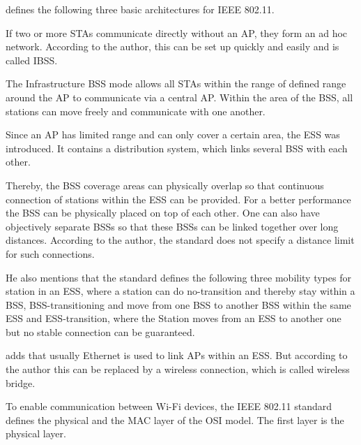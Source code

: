 \documentclass[]{nsm-thesis}
\begin{document}
\textcite[42,43,178-180]{kauffels_wireless_2002} defines the following three basic architectures for IEEE 802.11.

If two or more \acp{STA} communicate directly without an \ac{AP}, they form an ad hoc network.
According to the author, this can be set up quickly and easily and is called \ac{IBSS}.

The Infrastructure \ac{BSS} mode allows all \ac{STA}s within the range of defined range around the \ac{AP} to communicate via a central \ac{AP}. Within the area of the \ac{BSS}, all stations can move freely and communicate with one another.

Since an \ac{AP} has limited range and can only cover a certain area, the \ac{ESS} was introduced.
It contains a distribution system, which links several \ac{BSS} with each other.

Thereby, the BSS coverage areas can physically overlap so that continuous connection of stations within the ESS can be provided.
For a better performance the \ac{BSS} can be physically placed on top of each other.
One can also have objectively separate \ac{BSS}s so that these \ac{BSS}s can be linked together over long distances.
According to the author, the standard does not specify a distance limit for such connections.

He also mentions that the standard defines the following three mobility types for station in an \ac{ESS}, where a station can do no-transition and thereby stay within a \ac{BSS}, \ac{BSS}-transitioning and move from one \ac{BSS} to another \ac{BSS} within the same \ac{ESS} and \ac{ESS}-transition, where the Station moves from an \ac{ESS} to another one but no stable connection can be guaranteed.

\textcite[272, 273]{sauter_wireless_2022} adds that usually Ethernet is used to link \ac{AP}s within an \ac{ESS}.
But according to the author this can be replaced by a wireless connection, which is called wireless bridge.

To enable communication between Wi-Fi devices, the IEEE 802.11 standard defines the physical and the MAC layer of the OSI model. The first layer is the physical layer.









%

\begin{comment}
	\section{Modell für drahtlose Übertragungssysteme}
Abb 2.3.1  Modell einen Übertragungssystems
Beschränkungen und Regelungen Frequenzwahl, Sendeleistung
Analoger Kanal Störungen: thermisches Rauschen, Nebensprechen, Impulsstörungen
\fi

\end{comment}
\end{document}
